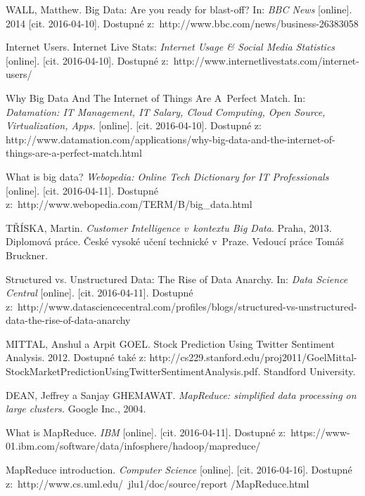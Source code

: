 \documentclass[thesis=B,czech]{FITthesis}[2012/06/26]
\begin{document}
\begin{thebibliography}{1}

 WALL, Matthew. Big Data: Are you ready for blast-off? In: \textit{BBC News} [online]. 2014 [cit. 2016-04-10]. Dostupné z:~http://www.bbc.com/news/business-26383058

 Internet Users. Internet Live Stats: \textit{Internet Usage \& Social Media Statistics} [online]. [cit. 2016-04-10]. Dostupné z:~http://www.internetlivestats.com/internet-users/

 Why Big Data And The Internet of Things Are A~Perfect Match. In: \textit{Datamation: IT Management, IT Salary, Cloud Computing, Open Source, Virtualization, Apps.} [online]. [cit. 2016-04-10]. Dostupné z: http://www.datamation.com/applications/why-big-data-and-the-internet-of-things-are-a-perfect-match.html

 What is big data? \textit{Webopedia: Online Tech Dictionary for IT Professionals} [online]. [cit. 2016-04-11]. Dostupné z:~http://www.webopedia.com/TERM/B/big\_data.html

 TŘÍSKA, Martin. \textit{Customer Intelligence v~kontextu Big Data}. Praha, 2013. Diplomová práce. České vysoké učení technické v~Praze. Vedoucí práce Tomáš Bruckner.

Structured vs. Unstructured Data: The Rise of Data Anarchy. In: \textit{Data Science Central} [online]. [cit. 2016-04-11]. Dostupné z:~http://www.datasciencecentral.com/profiles/blogs/structured-vs-unstructured-data-the-rise-of-data-anarchy

MITTAL, Anshul a Arpit GOEL. Stock Prediction Using Twitter Sentiment Analysis. 2012. Dostupné také z: http://cs229.stanford.edu/proj2011/GoelMittal-StockMarketPredictionUsingTwitterSentimentAnalysis.pdf. Standford University.

DEAN, Jeffrey a Sanjay GHEMAWAT. \textit{MapReduce: simplified data processing on large clusters.} Google Inc., 2004.

What is MapReduce. \textit{IBM} [online]. [cit. 2016-04-11]. Dostupné z:~https://www-01.ibm.com/software/data/infosphere/hadoop/mapreduce/

MapReduce introduction. \textit{Computer Science} [online]. [cit. 2016-04-16]. Dostupné z:~http://www.cs.uml.edu/~jlu1/doc/source/report
/MapReduce.html


\end{thebibliography}
\end{document}
